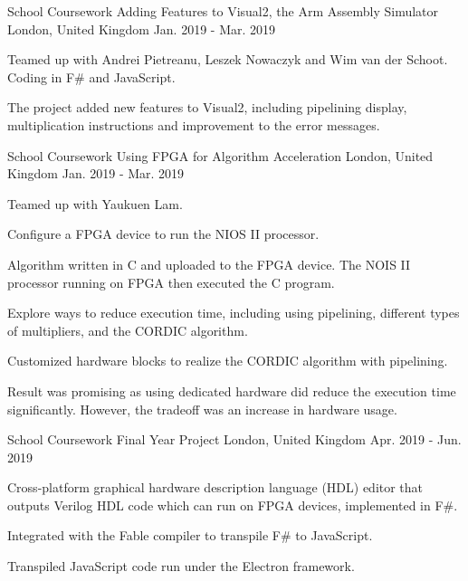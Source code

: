\begin{cventries}
    \cventry
    {School Coursework} %
    {Adding Features to Visual2, the Arm Assembly Simulator} %
    {London, United Kingdom} %
    {Jan. 2019 - Mar. 2019} %
    {
      \begin{cvitems} %
        \item {Teamed up with Andrei Pietreanu, Leszek Nowaczyk and Wim van der Schoot. Coding in F\# and JavaScript.}
        \item {The project added new features to Visual2, including pipelining display, multiplication instructions and improvement to the error messages.}
      \end{cvitems}
    }
    
    \cventry
    {School Coursework} %
    {Using FPGA for Algorithm Acceleration} %
    {London, United Kingdom} %
    {Jan. 2019 - Mar. 2019} %
    {
      \begin{cvitems} %
        \item {Teamed up with Yaukuen Lam.}
        \item {Configure a FPGA device to run the NIOS II processor.}
        \item {Algorithm written in C and uploaded to the FPGA device. The NOIS II processor running on FPGA then executed the C program.}
        \item {Explore ways to reduce execution time, including using pipelining, different types of multipliers, and the CORDIC algorithm.}
        \item {Customized hardware blocks to realize the CORDIC algorithm with pipelining.}
        \item {Result was promising as using dedicated hardware did reduce the execution time significantly. However, the tradeoff was an increase in hardware usage.}
      \end{cvitems}
    }
    
    \cventry
    {School Coursework} %
    {Final Year Project} %
    {London, United Kingdom} %
    {Apr. 2019 - Jun. 2019} %
    {
      \begin{cvitems} %
        \item {Cross-platform graphical hardware description language (HDL) editor that outputs Verilog HDL code which can run on FPGA devices, implemented in F\#.}
        \item {Integrated with the Fable compiler to transpile F\# to JavaScript.}
        \item {Transpiled JavaScript code run under the Electron framework.}
      \end{cvitems}
    }
    

\end{cventries}
